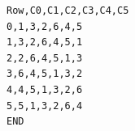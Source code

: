 \begin{verbatim}
Row,C0,C1,C2,C3,C4,C5
0,1,3,2,6,4,5
1,3,2,6,4,5,1
2,2,6,4,5,1,3
3,6,4,5,1,3,2
4,4,5,1,3,2,6
5,5,1,3,2,6,4
END
\end{verbatim}
